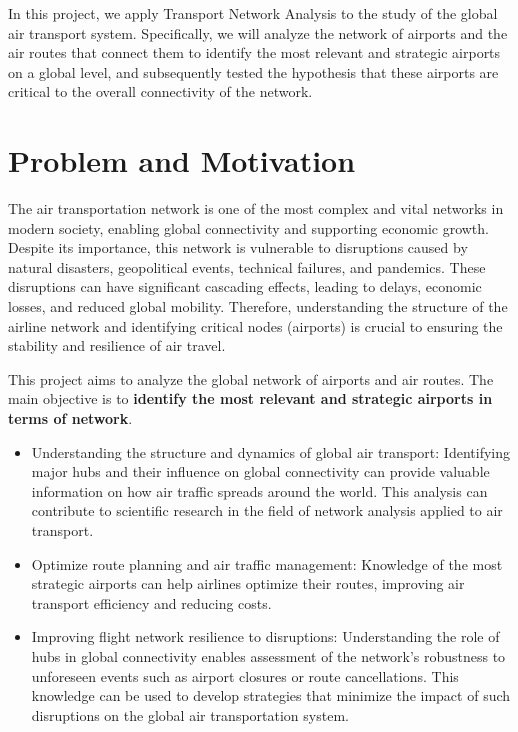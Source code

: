 \documentclass[12pt]{article}
\begin{document}
In this project, we apply Transport Network Analysis to the study of the global air transport system. Specifically, we will analyze the network of airports and the air routes that connect them to identify the most relevant and strategic airports on a global level, and subsequently tested the hypothesis that these airports are critical to the overall connectivity of the network.


\section{Problem and Motivation}
The air transportation network is one of the most complex and vital networks in modern society, enabling global connectivity and supporting economic growth. Despite its importance, this network is vulnerable to disruptions caused by natural disasters, geopolitical events, technical failures, and pandemics. These disruptions can have significant cascading effects, leading to delays, economic losses, and reduced global mobility. Therefore, understanding the structure of the airline network and identifying critical nodes (airports) is crucial to ensuring the stability and resilience of air travel.

This project aims to analyze the global network of airports and air routes. The main objective is to \textbf{identify the most relevant and strategic airports in terms of network}. 
\begin{itemize}
    \item Understanding the structure and dynamics of global air transport: Identifying major hubs and their influence on global connectivity can provide valuable information on how air traffic spreads around the world. This analysis can contribute to scientific research in the field of network analysis applied to air transport.
    \item Optimize route planning and air traffic management: Knowledge of the most strategic airports can help airlines optimize their routes, improving air transport efficiency and reducing costs.
    \item Improving flight network resilience to disruptions: Understanding the role of hubs in global connectivity enables assessment of the network's robustness to unforeseen events such as airport closures or route cancellations. This knowledge can be used to develop strategies that minimize the impact of such disruptions on the global air transportation system.
\end{itemize}
\end{document}
